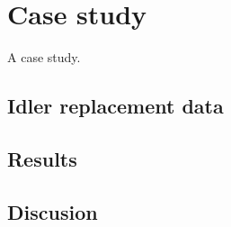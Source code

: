 \chapter{Case study}\label{chap:chapter4}

A case study.

\section{Idler replacement data}

\section{Results}

\section{Discusion}

